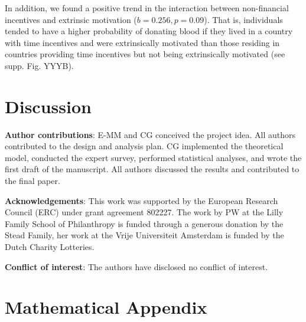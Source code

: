 \documentclass[AER]{AEA}
\begin{document}
In addition, we found a positive trend in the interaction between non-financial incentives and extrinsic motivation ($b = 0.256, p = 0.09$). That is, individuals tended to have a higher probability of donating blood if they lived in a country with time incentives and were extrinsically motivated than those residing in countries providing time incentives but not being extrinsically motivated (see supp. Fig. YYYB).

\section{Discussion}

\textbf{Author contributions}: E-MM and CG conceived the project idea. All authors contributed to the design and analysis plan. CG implemented the theoretical model, conducted the expert survey, performed statistical analyses, and wrote the first draft of the manuscript. All authors discussed the results and contributed to the final paper.

\textbf{Acknowledgements}: This work was supported by the European Research Council (ERC) under grant agreement 802227. The work by PW at the Lilly Family School of Philanthropy is funded through a generous donation by the Stead Family, her work at the Vrije Universiteit Amsterdam is funded by the Dutch Charity Lotteries.

\textbf{Conflict of interest}: The authors have disclosed no conflict of interest.

%
%
%
%
%




\appendix

\section{Mathematical Appendix}
\end{document}
